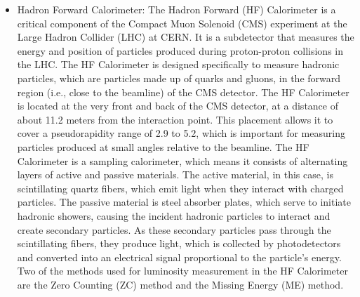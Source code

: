 \begin{itemize}

\item Hadron Forward Calorimeter: The Hadron Forward (HF) Calorimeter is a critical component of the Compact Muon Solenoid (CMS) experiment at the Large Hadron Collider (LHC) at CERN. It is a subdetector that measures the energy and position of particles produced during proton-proton collisions in the LHC. The HF Calorimeter is designed specifically to measure hadronic particles, which are particles made up of quarks and gluons, in the forward region (i.e., close to the beamline) of the CMS detector. The HF Calorimeter is located at the very front and back of the CMS detector, at a distance of about 11.2 meters from the interaction point. This placement allows it to cover a pseudorapidity range of 2.9 to 5.2, which is important for measuring particles produced at small angles relative to the beamline. The HF Calorimeter is a sampling calorimeter, which means it consists of alternating layers of active and passive materials. The active material, in this case, is scintillating quartz fibers, which emit light when they interact with charged particles. The passive material is steel absorber plates, which serve to initiate hadronic showers, causing the incident hadronic particles to interact and create secondary particles. As these secondary particles pass through the scintillating fibers, they produce light, which is collected by photodetectors and converted into an electrical signal proportional to the particle's energy. Two of the methods used for luminosity measurement in the HF Calorimeter are the Zero Counting (ZC) method and the Missing Energy (ME) method. 


\end{itemize}

